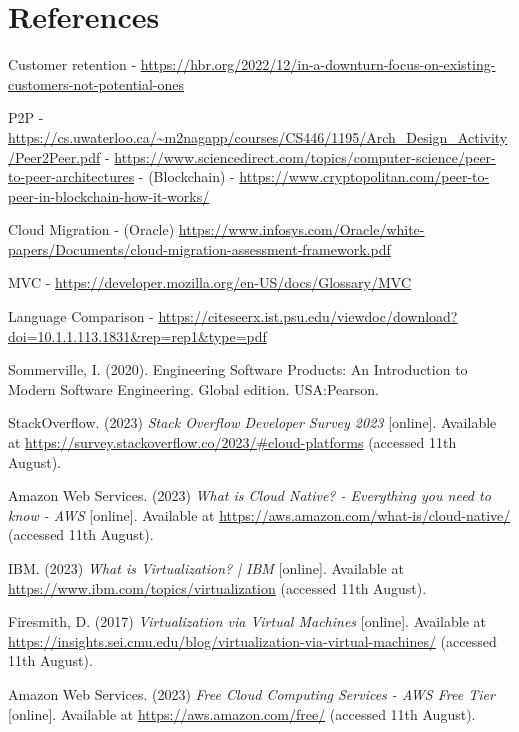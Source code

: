 \section{References}

Customer retention 
  - \url{https://hbr.org/2022/12/in-a-downturn-focus-on-existing-customers-not-potential-ones}

P2P
  - \url{https://cs.uwaterloo.ca/~m2nagapp/courses/CS446/1195/Arch_Design_Activity/Peer2Peer.pdf}
  - \url{https://www.sciencedirect.com/topics/computer-science/peer-to-peer-architectures}
  - (Blockchain) - \url{https://www.cryptopolitan.com/peer-to-peer-in-blockchain-how-it-works/}

Cloud Migration
  - (Oracle) \url{https://www.infosys.com/Oracle/white-papers/Documents/cloud-migration-assessment-framework.pdf}

MVC
  - \url{https://developer.mozilla.org/en-US/docs/Glossary/MVC}

Language Comparison
 - \url{https://citeseerx.ist.psu.edu/viewdoc/download?doi=10.1.1.113.1831&rep=rep1&type=pdf}

 \noindent [1] Sommerville, I. (2020). Engineering Software Products: An Introduction to Modern Software Engineering. Global edition. USA:Pearson.
 \vspace{0.2cm}

 \noindent [2] StackOverflow. (2023) \textit{Stack Overflow Developer Survey 2023} [online]. Available at \url{https://survey.stackoverflow.co/2023/#cloud-platforms} (accessed 11th August).
 \vspace{0.2cm}

 \noindent [3] Amazon Web Services. (2023) \textit{What is Cloud Native? - Everything you need to know - AWS} [online]. Available at \url{https://aws.amazon.com/what-is/cloud-native/} (accessed 11th August).
 \vspace{0.2cm}

 \noindent [4] IBM. (2023) \textit{What is Virtualization? | IBM} [online]. Available at \url{https://www.ibm.com/topics/virtualization} (accessed 11th August).
 \vspace{0.2cm}

 \noindent [5] Firesmith, D. (2017) \textit{Virtualization via Virtual Machines} [online]. Available at \url{https://insights.sei.cmu.edu/blog/virtualization-via-virtual-machines/} (accessed 11th August).
 \vspace{0.2cm}

 \noindent [6] Amazon Web Services. (2023) \textit{Free Cloud Computing Services - AWS Free Tier} [online]. Available at \url{https://aws.amazon.com/free/} (accessed 11th August).
 \vspace{0.2cm}

